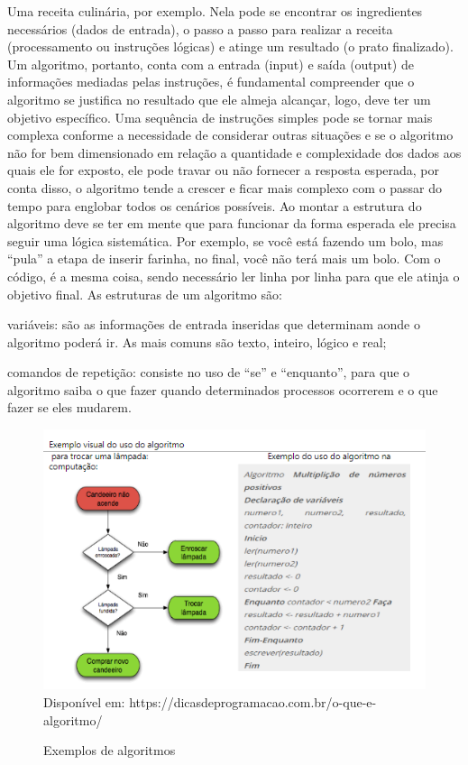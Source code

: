 Uma receita culinária, por exemplo. Nela pode se encontrar os ingredientes necessários (dados de entrada), o passo a passo para realizar a receita (processamento ou instruções lógicas) e atinge um resultado (o prato finalizado). 
Um algoritmo, portanto, conta com a entrada (input) e saída (output) de informações mediadas pelas instruções, é fundamental compreender que o algoritmo se justifica no resultado que ele almeja alcançar, logo, deve ter um objetivo específico. Uma sequência de instruções simples pode se tornar mais complexa conforme a necessidade de considerar outras situações e se o algoritmo não for bem dimensionado em relação a quantidade e complexidade dos dados aos quais ele for exposto, ele pode travar ou não fornecer a resposta esperada, por conta disso, o algoritmo tende a crescer e ficar mais complexo com o passar do tempo para englobar todos os cenários possíveis. 
Ao montar a estrutura do algoritmo deve se ter em mente que para funcionar da forma esperada ele precisa seguir uma lógica sistemática. Por exemplo, se você está fazendo um bolo, mas “pula” a etapa de inserir farinha, no final, você não terá mais um bolo. 
Com o código, é a mesma coisa, sendo necessário ler linha por linha para que ele atinja o objetivo final. As estruturas de um algoritmo são: 

\begin{description}
	\setlength\itemindent{15pt}
	\item[•] variáveis: são as informações de entrada inseridas que determinam aonde o algoritmo poderá ir. As mais comuns são texto, inteiro, lógico e real; 
	\item[•] comandos de repetição: consiste no uso de “se” e “enquanto”, para que o algoritmo saiba o que fazer quando determinados processos ocorrerem e o que fazer se eles mudarem. 
\end{description}

\begin{figure}[H]
	\centering
	\caption{Exemplos de algoritmos}
	\centering
	\includegraphics{./images/Figure_7}	
	\label{fig:Fig7}
	\centering
	\\Disponível em: https://dicasdeprogramacao.com.br/o-que-e-algoritmo/  
\end{figure}

